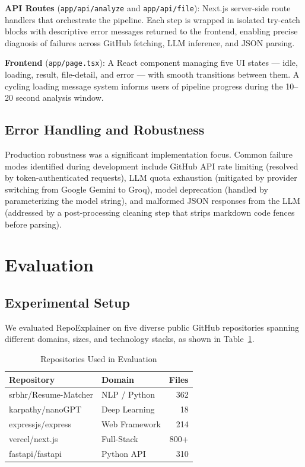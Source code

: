 \documentclass[conference]{IEEEtran}
\begin{document}
\textbf{API Routes} (\texttt{app/api/analyze} and \texttt{app/api/file}): Next.js server-side route handlers that orchestrate the pipeline. Each step is wrapped in isolated try-catch blocks with descriptive error messages returned to the frontend, enabling precise diagnosis of failures across GitHub fetching, LLM inference, and JSON parsing.

\textbf{Frontend} (\texttt{app/page.tsx}): A React component managing five UI states --- idle, loading, result, file-detail, and error --- with smooth transitions between them. A cycling loading message system informs users of pipeline progress during the 10--20 second analysis window.

\subsection{Error Handling and Robustness}

Production robustness was a significant implementation focus. Common failure modes identified during development include GitHub API rate limiting (resolved by token-authenticated requests), LLM quota exhaustion (mitigated by provider switching from Google Gemini to Groq), model deprecation (handled by parameterizing the model string), and malformed JSON responses from the LLM (addressed by a post-processing cleaning step that strips markdown code fences before parsing).

\section{Evaluation}

\subsection{Experimental Setup}

We evaluated RepoExplainer on five diverse public GitHub repositories spanning different domains, sizes, and technology stacks, as shown in Table~\ref{tab:repos}.

\begin{table}[h]
\caption{Repositories Used in Evaluation}
\label{tab:repos}
\begin{center}
\begin{tabular}{|l|l|r|}
\hline
\textbf{Repository} & \textbf{Domain} & \textbf{Files} \\
\hline
srbhr/Resume-Matcher & NLP / Python & 362 \\
karpathy/nanoGPT & Deep Learning & 18 \\
expressjs/express & Web Framework & 214 \\
vercel/next.js & Full-Stack & 800+ \\
fastapi/fastapi & Python API & 310 \\
\hline
\end{tabular}
\end{center}
\end{table}
\end{document}
